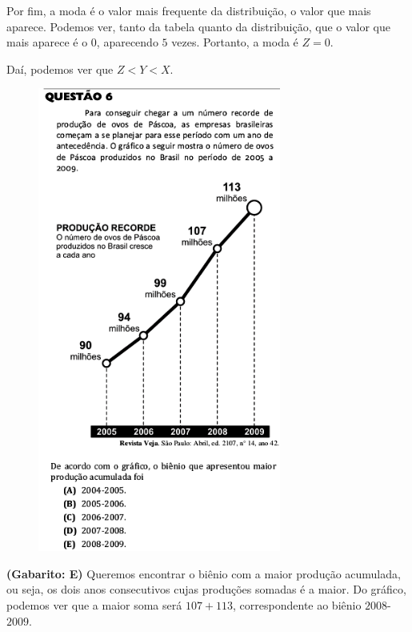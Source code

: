 \documentclass[a4paper]{article}
\begin{document}
\par\vspace{0.3cm} Por fim, a moda é o valor mais frequente da distribuição, o valor que mais aparece. Podemos ver, tanto da tabela quanto da distribuição, que o valor que mais aparece é o $0$, aparecendo $5$ vezes. Portanto, a moda é $Z = 0$.
\par\vspace{0.3cm} Daí, podemos ver que $Z<Y<X$.
\begin{figure}[H]
	\begin{center}
		\includegraphics[width=8cm]{L1Q6.png}
	\end{center}
\end{figure}
\par\textbf{(Gabarito: E)} Queremos encontrar o biênio com a maior produção acumulada, ou seja, os dois anos consecutivos cujas produções somadas é a maior. Do gráfico, podemos ver que a maior soma será $107+113$, correspondente ao biênio $2008$-$2009$.
\end{document}
